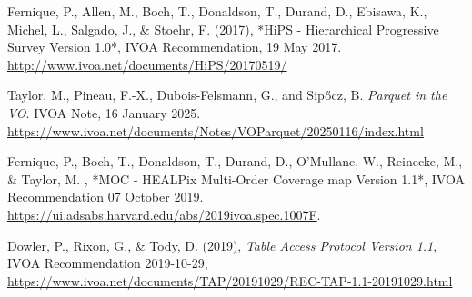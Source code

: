 \documentclass[11pt,a4paper]{ivoa}
\begin{document}
\begin{thebibliography}{}
Fernique, P., Allen, M., Boch, T., Donaldson, T., Durand, D., Ebisawa, K., Michel, L., Salgado, J., \& Stoehr, F. (2017), *HiPS - Hierarchical Progressive Survey Version 1.0*, IVOA Recommendation, 19 May 2017. \url{http://www.ivoa.net/documents/HiPS/20170519/}


Taylor, M., Pineau, F.-X., Dubois-Felsmann, G., and Sipőcz, B. \emph{Parquet in the VO}. IVOA Note, 16 January 2025. \url{https://www.ivoa.net/documents/Notes/VOParquet/20250116/index.html}




Fernique, P., Boch, T., Donaldson, T., Durand, D., O'Mullane, W., Reinecke, M., \& Taylor, M.  
\harvardyearright,  
*MOC - HEALPix Multi-Order Coverage map Version 1.1*,  
IVOA Recommendation 07 October 2019.  
\url{https://ui.adsabs.harvard.edu/abs/2019ivoa.spec.1007F}.

Dowler, P., Rixon, G., \& Tody, D. (2019),
\emph{Table Access Protocol Version 1.1},
IVOA Recommendation 2019-10-29, \url{https://www.ivoa.net/documents/TAP/20191029/REC-TAP-1.1-20191029.html}
\end{thebibliography}
\end{document}
